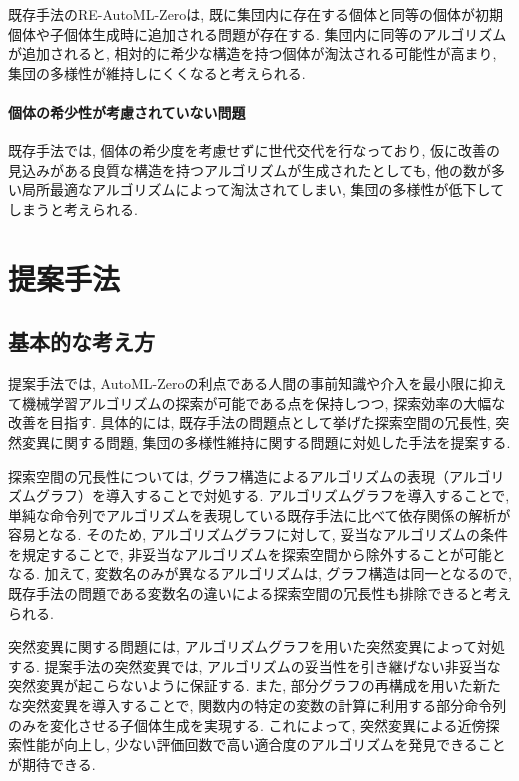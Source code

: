 \documentclass[11pt,oneside,openany,report]{jsbook}
\begin{document}
既存手法のRE-AutoML-Zeroは, 既に集団内に存在する個体と同等の個体が初期個体や子個体生成時に追加される問題が存在する. 集団内に同等のアルゴリズムが追加されると, 相対的に希少な構造を持つ個体が淘汰される可能性が高まり, 集団の多様性が維持しにくくなると考えられる.

\subsubsection{個体の希少性が考慮されていない問題}

既存手法では, 個体の希少度を考慮せずに世代交代を行なっており, 仮に改善の見込みがある良質な構造を持つアルゴリズムが生成されたとしても, 他の数が多い局所最適なアルゴリズムによって淘汰されてしまい, 集団の多様性が低下してしまうと考えられる.

\chapter{提案手法}\label{chap:proposed}

\section{基本的な考え方}

提案手法では, AutoML-Zeroの利点である人間の事前知識や介入を最小限に抑えて機械学習アルゴリズムの探索が可能である点を保持しつつ, 探索効率の大幅な改善を目指す. 具体的には, 既存手法の問題点として挙げた探索空間の冗長性, 突然変異に関する問題, 集団の多様性維持に関する問題に対処した手法を提案する.

探索空間の冗長性については, グラフ構造によるアルゴリズムの表現（アルゴリズムグラフ）を導入することで対処する. アルゴリズムグラフを導入することで, 単純な命令列でアルゴリズムを表現している既存手法に比べて依存関係の解析が容易となる. そのため, アルゴリズムグラフに対して, 妥当なアルゴリズムの条件を規定することで, 非妥当なアルゴリズムを探索空間から除外することが可能となる. 加えて, 変数名のみが異なるアルゴリズムは, グラフ構造は同一となるので, 既存手法の問題である変数名の違いによる探索空間の冗長性も排除できると考えられる.

突然変異に関する問題には, アルゴリズムグラフを用いた突然変異によって対処する. 提案手法の突然変異では, アルゴリズムの妥当性を引き継げない非妥当な突然変異が起こらないように保証する. また, 部分グラフの再構成を用いた新たな突然変異を導入することで, 関数内の特定の変数の計算に利用する部分命令列のみを変化させる子個体生成を実現する. これによって, 突然変異による近傍探索性能が向上し, 少ない評価回数で高い適合度のアルゴリズムを発見できることが期待できる.
\end{document}
